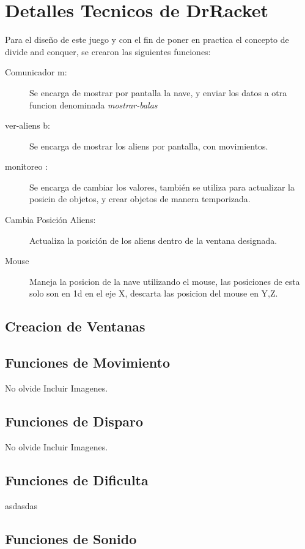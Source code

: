 \documentclass[a4paper]{article}
\begin{document}
\section{Detalles Tecnicos de  DrRacket \label{Funciones}}
Para el diseño de este juego y con el fin de poner en practica el concepto de divide and conquer, se crearon las 
siguientes funciones:
\begin{description}
    \item[Comunicador m:] Se encarga de mostrar por pantalla la nave, y enviar los datos a otra funcion denominada \textit{mostrar-balas}
    \item[ver-aliens b:] Se encarga de mostrar los aliens por pantalla, con movimientos.
    \item[monitoreo :]Se encarga de cambiar los valores, también se utiliza para actualizar la posicin de objetos, y crear objetos de manera temporizada. 
    \item[Cambia Posición Aliens:]Actualiza la posición de los aliens dentro de la ventana designada.
    \item[Mouse] Maneja la posicion de la nave utilizando el mouse, las posiciones de esta solo son en 1d 
        en el eje X, descarta las posicion del mouse en Y,Z.
\end{description}
\subsection{Creacion de Ventanas}

\subsection{Funciones de Movimiento}
No olvide Incluir Imagenes.

\subsection{Funciones de Disparo}
No olvide Incluir Imagenes.
\subsection{Funciones de Dificulta}
asdasdas
\subsection{Funciones de Sonido}
\end{document}
